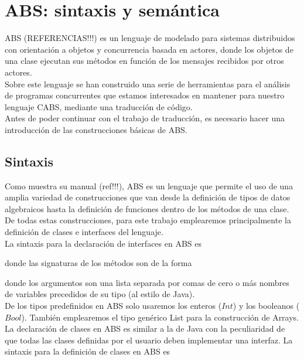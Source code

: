 \chapter{ABS: sintaxis y semántica}

ABS (REFERENCIAS!!!) es un lenguaje de modelado para sistemas distribuidos con orientación a objetos y concurrencia basada en actores, donde los objetos de una clase ejecutan sus métodos en función de los mensajes recibidos por otros actores.\\

Sobre este lenguaje se han construido una serie de herramientas para el análisis de programas concurrentes que estamos interesados en mantener para nuestro lenguaje CABS, mediante una traducción de código.\\

Antes de poder continuar con el trabajo de traducción, es necesario hacer una introducción de las construcciones básicas de ABS.

\section{Sintaxis}

Como muestra su manual (ref!!!), ABS es un lenguaje que permite el uso de una amplia variedad de construcciones que van desde la definición de tipos de datos algebraicos hasta la definición de funciones dentro de los métodos de una clase.\\

De todas estas construcciones, para este trabajo emplearemos principalmente la definición de clases e interfaces del lenguaje.\\

La sintaxis para la declaración de interfaces en ABS es



donde las signaturas de los métodos son de la forma



donde los argumentos son una lista separada por comas de cero o más nombres de variables precedidos de su tipo (al estilo de Java).\\

De los tipos predefinidos en ABS solo usaremos los enteros ($Int$) y los booleanos ($Bool$). También emplearemos el tipo genérico List para la construcción de Arrays.\\

La declaración de clases en ABS es similar a la de Java con la peculiaridad de que todas las clases definidas por el usuario deben implementar una interfaz. La sintaxis para la definición de clases en ABS es

